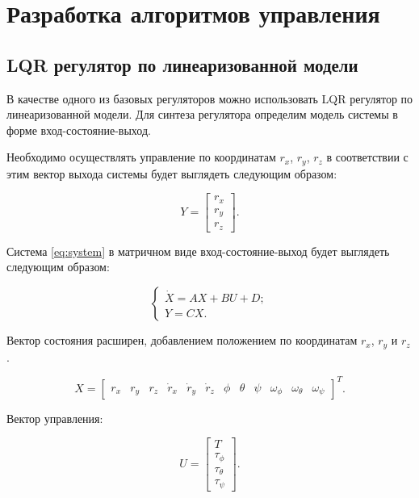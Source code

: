 \chapter{Разработка алгоритмов управления}
\label{ch:chap2}

\section{LQR регулятор по линеаризованной модели}

В качестве одного из базовых регуляторов можно использовать LQR регулятор по линеаризованной модели.
Для синтеза регулятора определим модель системы в форме вход-состояние-выход. 

Необходимо осуществлять управление по координатам \(r_x\), \(r_y\), \(r_z\) в соответствии с этим вектор
выхода системы будет выглядеть следующим образом:

\begin{equation}
Y = \begin{bmatrix}
    r_x \\
    r_y \\
    r_z
\end{bmatrix}.
\end{equation}


Система \eqref{eq:system} в матричном виде вход-состояние-выход будет выглядеть следующим образом:


\begin{equation}
    \begin{cases}
        \dot{X} = A X + B U + D;\\
        Y = C X.
    \end{cases}
\end{equation}


Вектор состояния расширен, добавлением положением по координатам \(r_x\), \(r_y\) и \(r_z\).

\begin{equation}
X = \begin{bmatrix} 
    r_x & 
    r_y & 
    r_z & 
    \dot{r}_x & 
    \dot{r}_y & 
    \dot{r}_z & 
    \phi &
    \theta & 
    \psi &
    \omega_{\phi} & 
    \omega_{\theta} & 
    \omega_{\psi} 
\end{bmatrix}^T.
\end{equation}

Вектор управления:

\begin{equation}
U = \begin{bmatrix}
    T \\
    \tau_\phi \\
    \tau_\theta \\
    \tau_\psi
\end{bmatrix}.
\end{equation}

